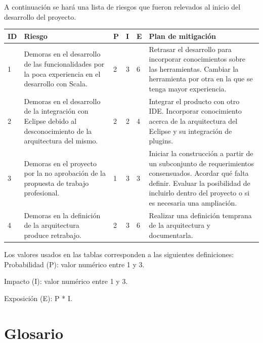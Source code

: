 \documentclass[12pt,a4paper]{article}
\begin{document}
A continuación se hará una lista de riesgos que fueron relevados al inicio del desarrollo del proyecto.

\begin{center}
    \begin{tabular}{ | l | p{5cm} | l | l | l | p{5cm} |}
    \hline
    ID & Riesgo & P & I & E & Plan de mitigación \\ \hline

	1 & Demoras en el desarrollo de las funcionalidades por la poca experiencia en el desarrollo con Scala.
	& 2 & 3 & 6 &
	Retrasar el desarrollo para incorporar conocimientos sobre las herramientas.
	Cambiar la herramienta por otra en la que se tenga mayor experiencia. \\ \hline

	2 & Demoras en el desarrollo de la integración con Eclipse debido al desconocimiento de la arquitectura del mismo.
	& 2 & 2 & 4 &
	Integrar el producto con otro IDE. Incorporar conocimiento acerca de la arquitectura del Eclipse y su integración de plugins. \\ \hline

	3 & Demoras en el proyecto por la no aprobación de la propuesta de trabajo profesional.
	& 1 & 3 & 3 &
	Iniciar la construcción a partir de un subconjunto de requerimientos consensuados. Acordar qué falta definir. Evaluar la posibilidad de incluirlo dentro del proyecto o si es necesaria una ampliación. \\ \hline

	4 & Demoras en la definición de la arquitectura produce retrabajo.
	& 2 & 3 & 6 &
	Realizar una definición temprana de la arquitectura y documentarla. \\ \hline
    \end{tabular}
\end{center}

Los valores usados en las tablas corresponden a las siguientes definiciones: \\

Probabilidad (P): valor numérico entre 1 y 3.

Impacto (I): valor numérico entre 1 y 3.

Exposición (E): P * I.

\newpage
	\section{Glosario}
\end{document}
